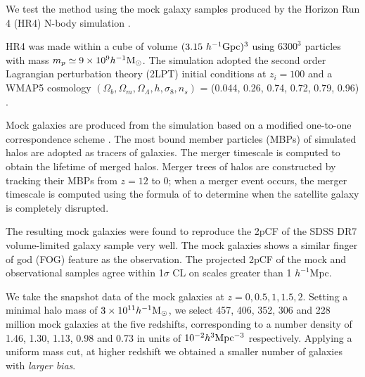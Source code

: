 \documentclass[iop]{emulateapj}
\newcommand{\hMsun}{{\ifmmode{h^{-1}{\rm
        {M_{\odot}}}}\else{$h^{-1}{\rm{M_{\odot}}}$~}\fi}}
\begin{document}
We test the method using the mock galaxy samples produced by the Horizon Run 4  (HR4) N-body simulation \citep{hr4,hong2016}.

HR4 was made within a cube of volume $({3.15}\ h^{-1}\rm Gpc)^3$ using  $6300^3$ particles with mass $m_p\simeq 9 \times 10^9 \hMsun$.
The simulation adopted the second order Lagrangian perturbation theory (2LPT) initial conditions at $z_{i}=100$
and a WMAP5 cosmology $(\Omega_{b},\Omega_{m},\Omega_\Lambda,h,\sigma_8,n_s)$  = (0.044, 0.26, 0.74, 0.72, 0.79, 0.96) \citep{komatsu 2011}.

Mock galaxies are produced from the simulation based on a modified one-to-one correspondence scheme \citep{hong2016}. 
The most bound member particles (MBPs) of simulated halos are adopted as tracers of galaxies.
The merger timescale is computed to obtain the lifetime of merged halos.
Merger trees of halos are constructed by tracking their MBPs from $z = 12$ to 0;
when a merger event occurs, the merger timescale is computed using the formula of \cite{jiang2008} to 
determine when the satellite galaxy is completely disrupted.

The resulting mock galaxies were found to reproduce the 2pCF of the SDSS DR7 volume-limited galaxy sample \citep{zehavi2011} very well.
The mock galaxies shows a similar finger of god (FOG) feature \citep{FOG} as the observation.
The projected 2pCF of the mock and observational samples agree within 1$\sigma$ CL
on scales greater than 1 ${h^{-1}}$Mpc.

We take the snapshot data of the mock galaxies at $z=0,0.5,1,1.5,2$.
Setting a minimal halo mass of $3\times 10^{11} \hMsun$, 
we select 457, 406, 352, 306 and 228 million mock galaxies at the five redshifts,
corresponding to a number density of 
1.46, 1.30, 1.13, 0.98 and 0.73 in units of $ 10^{-2} h^{3} \rm Mpc^{-3}$
respectively.
Applying a uniform mass cut, at higher redshift we obtained a smaller number of galaxies with {\it larger bias}.
\end{document}

